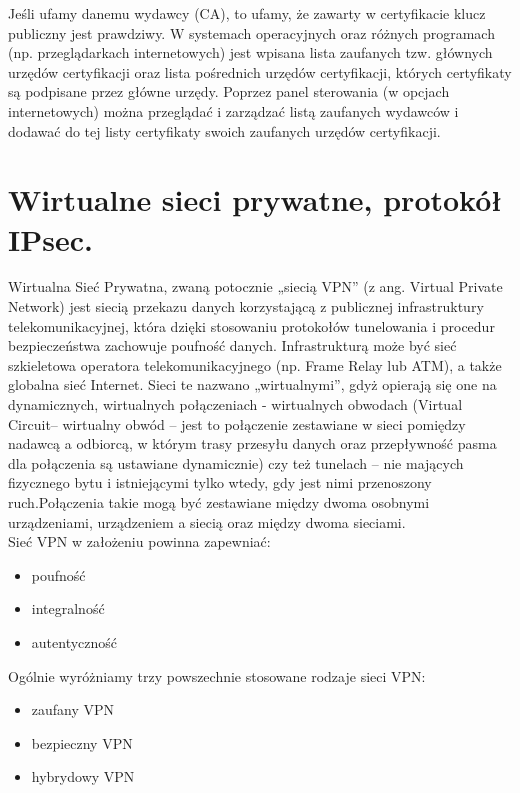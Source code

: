 \documentclass[main.tex]{subfiles}
\begin{document}
    Jeśli ufamy danemu wydawcy (CA), to ufamy, że zawarty w certyfikacie klucz publiczny jest prawdziwy.
    W systemach operacyjnych oraz różnych programach (np. przeglądarkach internetowych)
    jest wpisana lista zaufanych tzw. głównych urzędów certyfikacji oraz lista pośrednich
    urzędów certyfikacji, których certyfikaty są podpisane przez główne urzędy. Poprzez panel
    sterowania (w opcjach internetowych) można przeglądać i zarządzać listą zaufanych
    wydawców i dodawać do tej listy certyfikaty swoich zaufanych urzędów certyfikacji.

    \newpage
    \section{Wirtualne sieci prywatne, protokół IPsec.}
    Wirtualna Sieć Prywatna, zwaną potocznie „siecią VPN” (z ang. Virtual Private Network) jest siecią przekazu danych korzystającą z publicznej infrastruktury telekomunikacyjnej, która dzięki stosowaniu protokołów tunelowania i procedur bezpieczeństwa zachowuje poufność danych. Infrastrukturą może być sieć szkieletowa operatora telekomunikacyjnego (np. Frame Relay lub ATM), a także globalna sieć Internet. Sieci te nazwano „wirtualnymi”, gdyż opierają się one na dynamicznych, wirtualnych połączeniach - wirtualnych obwodach (Virtual Circuit– wirtualny obwód – jest to połączenie zestawiane w sieci pomiędzy nadawcą a odbiorcą, w którym trasy przesyłu danych oraz przepływność pasma dla połączenia są ustawiane dynamicznie) czy też tunelach – nie mających fizycznego bytu i istniejącymi tylko wtedy, gdy jest nimi przenoszony ruch.Połączenia takie mogą być zestawiane między dwoma osobnymi urządzeniami, urządzeniem a siecią oraz między dwoma sieciami.\\
    Sieć VPN w założeniu powinna zapewniać:
    \begin{itemize}
        \item poufność
        \item integralność
        \item autentyczność
    \end{itemize}

    Ogólnie wyróżniamy trzy powszechnie stosowane rodzaje sieci VPN:
    \begin{itemize}
        \item zaufany VPN
        \item bezpieczny VPN
        \item hybrydowy VPN
    \end{itemize}
\end{document}
